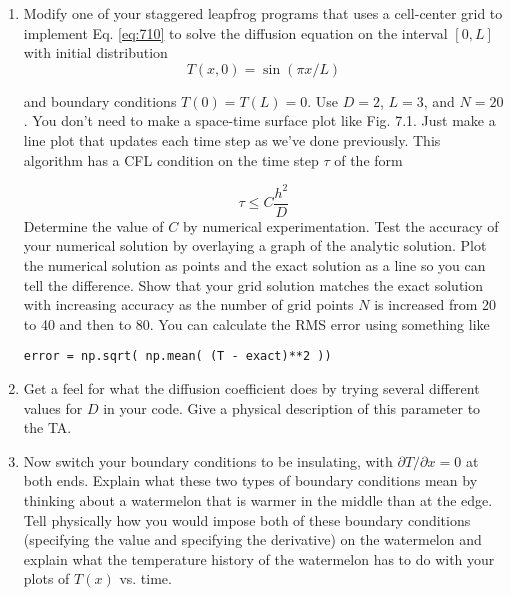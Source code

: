 \begin{problem}\label{P7.1}
\begin{enumerate}[label=(\alph*)]
\item 
Modify one of your staggered leapfrog programs that uses a cell-center
grid to implement Eq. \ref{eq:710} to solve the diffusion equation on the
interval $[0,L]$ with initial distribution
\begin{equation}\label{eq:711}
T(x, 0)=\sin (\pi x / L)
\end{equation}

and boundary conditions $ T(0) = T (L) = 0$. Use $D = 2$, $L = 3$, and $N =
20$. You don\rq t need to make a space-time surface plot like Fig. 7.1. Just
make a line plot that updates each time step as we\rq ve done previously.
This algorithm has a CFL condition on the time step $\tau$ of the form

\begin{equation}\label{eq:712}
\tau \leq C \frac{h^{2}}{D}
\end{equation}
Determine the value of $C$ by numerical experimentation.
Test the accuracy of your numerical solution by overlaying a graph of
the analytic solution. Plot the numerical solution as points and the
exact solution as a line so you can tell the difference. Show that your
grid solution matches the exact solution with increasing accuracy as
the number of grid points $N$ is increased from 20 to 40 and then to 80.
You can calculate the RMS error using something like
\begin{lstlisting}
error = np.sqrt( np.mean( (T - exact)**2 ))
\end{lstlisting}

\item Get a feel for what the diffusion coefficient does by trying several
different values for $D$ in your code. Give a physical description of this
parameter to the TA.
\item Now switch your boundary conditions to be insulating, with $\partial T / \partial x=
0$ at both ends. Explain what these two types of boundary conditions
mean by thinking about a watermelon that is warmer in the middle
than at the edge. Tell physically how you would impose both of these
boundary conditions (specifying the value and specifying the derivative) on the watermelon and explain what the temperature history of
the watermelon has to do with your plots of $T(x)$ vs. time.
\end{enumerate}
\end{problem}

